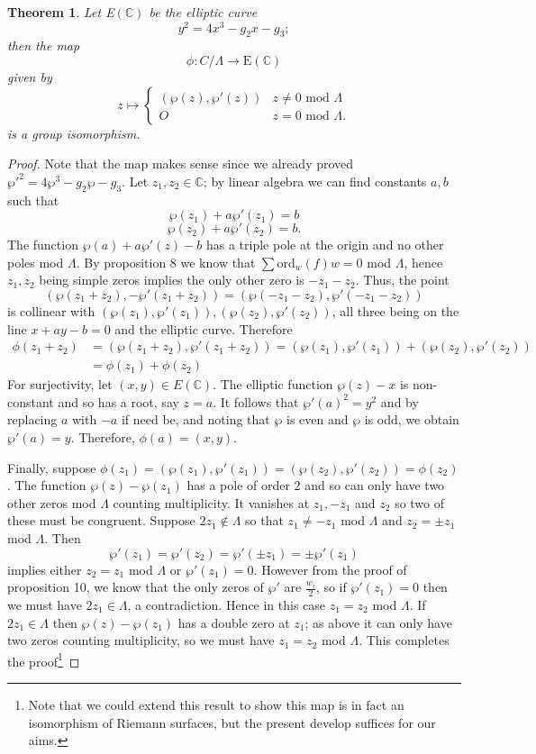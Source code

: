 \documentclass{article}
\newtheorem{theorem}{Theorem}
\theoremstyle{remark}
\begin{document}
\begin{theorem}
Let E$(\mathbb{C})$ be the elliptic curve
\[ y^2=4x^3-g_2x-g_3; \]
then the map
\[\phi: C/\Lambda \rightarrow \text{E}(\mathbb{C})\]
given by
\[z\mapsto\begin{cases}
    (\wp(z),\wp'(z))                       & z\neq0\text{ mod }\Lambda\\
    O                            &z=0\text{ mod }\Lambda.
  \end{cases}\]
is a group isomorphism.
\end{theorem}
\begin{proof}
Note that the map makes sense since we already proved $\wp'^2=4\wp^3-g_2\wp-g_3$. Let $z_1,z_2\in\mathbb{C}$; by linear algebra we can find constants $a,b$ such that
\[\wp(z_1)+a\wp'(z_1)=b\]
\[\wp(z_2)+a\wp'(z_2)=b.\]
The function $\wp(a)+a\wp'(z)-b$ has a triple pole at the origin and no other poles mod $\Lambda$. By proposition $8$ we know that $\sum$ord$_w(f)w=0$ mod $\Lambda$, hence $z_1,z_2$ being simple zeros implies the only other zero is $-z_1-z_2$. Thus, the point
\[(\wp(z_1+z_2),-\wp'(z_1+z_2))=(\wp(-z_1-z_2),\wp'(-z_1-z_2))\]
is collinear with $(\wp(z_1),\wp'(z_1)),(\wp(z_2),\wp'(z_2))$, all three being on the line $x+ay-b=0$ and the elliptic curve. Therefore 
\begin{align*}
\phi(z_1+z_2)&=(\wp(z_1+z_2),\wp'(z_1+z_2))=(\wp(z_1),\wp'(z_1))+(\wp(z_2),\wp'(z_2))\\
&=\phi(z_1)+\phi(z_2)
\end{align*}
For surjectivity, let $(x,y)\in E(\mathbb{C})$. The elliptic function $\wp(z)-x$ is non-constant and so has a root, say $z=a$. It follows that $\wp'(a)^2=y^2$ and by replacing $a$ with $-a$ if need be, and noting that $\wp$ is even and $\wp$ is odd, we obtain $\wp'(a)=y$. Therefore, $\phi(a)=(x,y)$.

Finally, suppose $\phi(z_1)=(\wp(z_1),\wp'(z_1))=(\wp(z_2),\wp'(z_2))=\phi(z_2)$. The function $\wp(z)-\wp(z_1)$ has a pole of order $2$ and so can only have two other zeros mod $\Lambda$ counting multiplicity. It vanishes at $z_1,-z_1$ and $z_2$ so two of these must be congruent. Suppose $2z_1\not\in\Lambda$ so that $z_1\neq-z_1$ mod $\Lambda$ and $z_2=\pm z_1$ mod $\Lambda$. Then
\[\wp'(z_1)=\wp'(z_2)=\wp'(\pm z_1)=\pm\wp'(z_1)\]
implies either $z_2=z_1$ mod $\Lambda$ or $\wp'(z_1)=0$. However from the proof of proposition 10, we know that the only zeros of $\wp'$ are $\frac{w_i}{2}$, so if $\wp'(z_1)=0$ then we must have $2z_1\in\Lambda$, a contradiction. Hence in this case $z_1=z_2$ mod $\Lambda$. If $2z_1\in\Lambda$ then $\wp(z)-\wp(z_1)$ has a double zero at $z_1$; as above it can only have two zeros counting multiplicity, so we must have $z_1=z_2$ mod $\Lambda$. This completes the proof\footnote{Note that we could extend this result to show this map is in fact an isomorphism of Riemann surfaces, but the present develop suffices for our aims.}

\end{proof}
\end{document}

